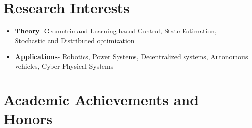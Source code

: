 \documentclass[10pt,letterpaper,sans]{moderncv}        %
\newcommand\shorter{10}
\begin{document}
\vspace{-0.20 cm}
\section{Research Interests}


\begin{itemize}
    \item \textbf{Theory}- Geometric and Learning-based Control, State Estimation, Stochastic and Distributed optimization
    \item \textbf{Applications}- Robotics, Power Systems, Decentralized systems, Autonomous vehicles, Cyber-Physical Systems
\end{itemize}
\vspace{-0.25 cm}
\section{Academic Achievements and Honors}
\end{document}
